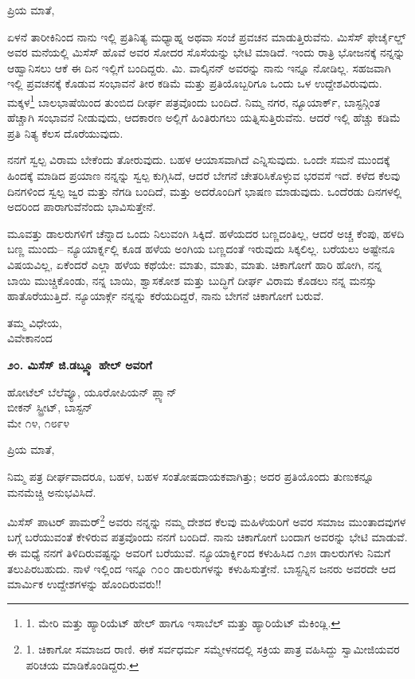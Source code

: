 ಪ್ರಿಯ ಮಾತೆ,

ಏಳನೆ ತಾರೀಕಿನಿಂದ ನಾನು ಇಲ್ಲಿ ಪ್ರತಿನಿತ್ಯ ಮಧ್ಯಾಹ್ನ ಅಥವಾ ಸಂಜೆ ಪ್ರವಚನ ಮಾಡುತ್ತಿರುವೆನು. ಮಿಸೆಸ್ ಫೇರ್ಚೈಲ್ಡ್ ಅವರ ಮನೆಯಲ್ಲಿ ಮಿಸೆಸ್ ಹೊವೆ ಅವರ ಸೋದರ ಸೊಸೆಯನ್ನು ಭೇಟಿ ಮಾಡಿದೆ. ಇಂದು ರಾತ್ರಿ ಭೋಜನಕ್ಕೆ ನನ್ನನ್ನು ಆಹ್ವಾನಿಸಲು ಆಕೆ ಈ ದಿನ ಇಲ್ಲಿಗೆ ಬಂದಿದ್ದರು. ಮಿ. ವಾಲ್ಕಿನನ್ ಅವರನ್ನು ನಾನು ಇನ್ನೂ ನೋಡಿಲ್ಲ. ಸಹಜವಾಗಿ ಇಲ್ಲಿ ಪ್ರವಚನಕ್ಕೆ ಕೊಡುವ ಸಂಭಾವನೆ ತೀರ ಕಡಿಮೆ ಮತ್ತು ಪ್ರತಿಯೊಬ್ಬರಿಗೂ ಒಂದು ಒಳ ಉದ್ದೇಶವಿರುವುದು. ಮಕ್ಕಳ\footnote{1. ಮೇರಿ ಮತ್ತು ಹ್ಯಾರಿಯೆಟ್ ಹೇಲ್ ಹಾಗೂ ಇಸಾಬೆಲ್ ಮತ್ತು ಹ್ಯಾರಿಯೆಟ್ ಮೆಕಿಂಡ್ಲಿ.} ಬಾಲಭಾಷೆಯಿಂದ ತುಂಬಿದ ದೀರ್ಘ ಪತ್ರವೊಂದು ಬಂದಿದೆ. ನಿಮ್ಮ ನಗರ, ನ್ಯೂಯಾರ್ಕ್, ಬಾಸ್ಟನ್ಗಿಂತ ಹೆಚ್ಚಾಗಿ ಸಂಭಾವನೆ ನೀಡುವುದು, ಆದಕಾರಣ ಅಲ್ಲಿಗೆ ಹಿಂತಿರುಗಲು ಯತ್ನಿಸುತ್ತಿರುವೆನು. ಆದರೆ ಇಲ್ಲಿ ಹೆಚ್ಚು ಕಡಿಮೆ ಪ್ರತಿ ನಿತ್ಯ ಕೆಲಸ ದೊರೆಯುವುದು.

ನನಗೆ ಸ್ವಲ್ಪ ವಿರಾಮ ಬೇಕೆಂದು ತೋರುವುದು. ಬಹಳ ಆಯಾಸವಾಗಿದೆ ಎನ್ನಿಸುವುದು. ಒಂದೇ ಸಮನೆ ಮುಂದಕ್ಕೆ ಹಿಂದಕ್ಕೆ ಮಾಡಿದ ಪ್ರಯಾಣ ನನ್ನನ್ನು ಸ್ವಲ್ಪ ಕುಗ್ಗಿಸಿದೆ, ಆದರೆ ಬೇಗನೆ ಚೇತರಿಸಿಕೊಳ್ಳುವ ಭರವಸೆ ಇದೆ. ಕಳೆದ ಕೆಲವು ದಿನಗಳಿಂದ ಸ್ವಲ್ಪ ಜ್ವರ ಮತ್ತು ನೆಗಡಿ ಬಂದಿದೆ, ಮತ್ತು ಅದರೊಂದಿಗೆ ಭಾಷಣ ಮಾಡುವುದು. ಒಂದೆರಡು ದಿನಗಳಲ್ಲಿ ಅದರಿಂದ ಪಾರಾಗುವೆನೆಂದು ಭಾವಿಸುತ್ತೇನೆ.

ಮೂವತ್ತು ಡಾಲರುಗಳಿಗೆ ಚೆನ್ನಾದ ಒಂದು ನಿಲುವಂಗಿ ಸಿಕ್ಕಿದೆ. ಹಳೆಯದರ ಬಣ್ಣದಂತಿಲ್ಲ, ಆದರೆ ಅಚ್ಚ ಕೆಂಪು, ಹಳದಿ ಬಣ್ಣ ಮುಂದು– ನ್ಯೂಯಾರ್ಕ್ನಲ್ಲಿ ಕೂಡ ಹಳೆಯ ಅಂಗಿಯ ಬಣ್ಣದಂತೆ ಇರುವುದು ಸಿಕ್ಕಲಿಲ್ಲ. ಬರೆಯಲು ಅಷ್ಟೇನೂ ವಿಷಯವಿಲ್ಲ, ಏಕೆಂದರೆ ಎಲ್ಲಾ ಹಳೆಯ ಕಥೆಯೇ: ಮಾತು, ಮಾತು, ಮಾತು. ಚಿಕಾಗೋಗೆ ಹಾರಿ ಹೋಗಿ, ನನ್ನ ಬಾಯಿ ಮುಚ್ಚಿಕೊಂಡು, ನನ್ನ ಬಾಯಿ, ಶ್ವಾಸಕೋಶ ಮತ್ತು ಬುದ್ಧಿಗೆ ದೀರ್ಘ ವಿರಾಮ ಕೊಡಲು ನನ್ನ ಮನಸ್ಸು ಹಾತೊರೆಯುತ್ತಿದೆ. ನ್ಯೂಯಾರ್ಕ್ಗೆ ನನ್ನನ್ನು ಕರೆಯದಿದ್ದರೆ, ನಾನು ಬೇಗನೆ ಚಿಕಾಗೋಗೆ ಬರುವೆ.

\begin{flushright}
ತಮ್ಮ ವಿಧೇಯ,\\ವಿವೇಕಾನಂದ
\end{flushright}

\begin{center}
\textbf{೨೦. ಮಿಸೆಸ್ ಜಿ.ಡಬ್ಲ್ಯೂ ಹೇಲ್ ಅವರಿಗೆ}
\end{center}

\begin{flushright}
ಹೋಟೆಲ್ ಬೆಲೆವ್ಯೂ, ಯೂರೋಪಿಯನ್ ಪ್ಲ್ಯಾನ್\\ಬೀಕನ್ ಸ್ಟ್ರೀಟ್, ಬಾಸ್ಟನ್\\ಮೇ ೧೪, ೧೮೯೪
\end{flushright}

ಪ್ರಿಯ ಮಾತೆ,

ನಿಮ್ಮ ಪತ್ರ ದೀರ್ಘವಾದರೂ, ಬಹಳ, ಬಹಳ ಸಂತೋಷದಾಯಕವಾಗಿತ್ತು; ಅದರ ಪ್ರತಿಯೊಂದು ತುಣುಕನ್ನೂ ಮನಮೆಚ್ಚಿ ಅನುಭವಿಸಿದೆ.

ಮಿಸೆಸ್ ಪಾಟರ್ ಪಾಮರ್\footnote{1. ಚಿಕಾಗೋ ಸಮಾಜದ ರಾಣಿ. ಈಕೆ ಸರ್ವಧರ್ಮ ಸಮ್ಮೇಳನದಲ್ಲಿ ಸಕ್ರಿಯ ಪಾತ್ರ ವಹಿಸಿದ್ದು ಸ್ವಾಮೀಜಿಯವರ ಪರಿಚಯ ಮಾಡಿಕೊಂಡಿದ್ದರು.} ಅವರು ನನ್ನನ್ನು ನಮ್ಮ ದೇಶದ ಕೆಲವು ಮಹಿಳೆಯರಿಗೆ ಅವರ ಸಮಾಜ ಮುಂತಾದವುಗಳ ಬಗ್ಗೆ ಬರೆಯುವಂತೆ ಕೇಳಿರುವ ಪತ್ರವೊಂದು ನನಗೆ ಬಂದಿದೆ. ನಾನು ಚಿಕಾಗೋಗೆ ಬಂದಾಗ ಅವರನ್ನು ಭೇಟಿ ಮಾಡುವೆ. ಈ ಮಧ್ಯೆ ನನಗೆ ತಿಳಿದಿರುವಷ್ಟನ್ನು ಅವರಿಗೆ ಬರೆಯುವೆ. ನ್ಯೂಯಾರ್ಕ್ನಿಂದ ಕಳುಹಿಸಿದ ೧೨೫ ಡಾಲರುಗಳು ನಿಮಗೆ ತಲುಪಿರಬಹುದು. ನಾಳೆ ಇಲ್ಲಿಂದ ಇನ್ನೂ ೧೦೦ ಡಾಲರುಗಳನ್ನು ಕಳುಹಿಸುತ್ತೇನೆ. ಬಾಸ್ಟನ್ನಿನ ಜನರು ಅವರದೇ ಆದ ಮಾರ್ಮಿಕ ಉದ್ದೇಶಗಳನ್ನು ಹೊಂದಿರುವರು!!

